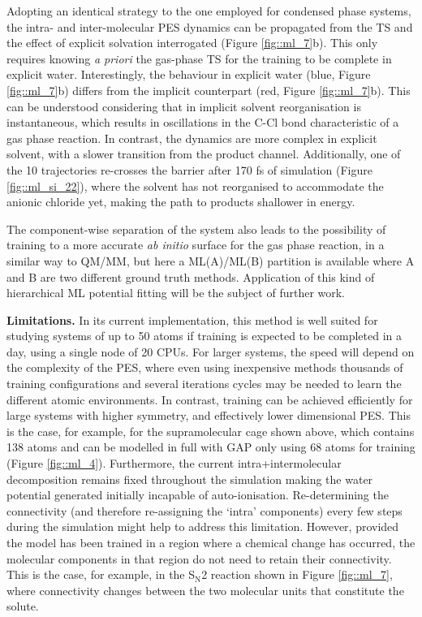 \documentclass[../../main.tex]{subfiles}
\begin{document}
Adopting an identical strategy to the one employed for condensed phase systems, the intra- and inter-molecular PES dynamics can be propagated from the TS and the effect of explicit solvation interrogated (Figure \ref{fig::ml_7}b). This only requires knowing \emph{a priori} the gas-phase TS for the training to be complete in explicit water. Interestingly, the behaviour in explicit water (blue, Figure \ref{fig::ml_7}b) differs from the implicit counterpart (red, Figure \ref{fig::ml_7}b). This can be understood considering that in implicit solvent reorganisation is instantaneous, which results in oscillations in the C-Cl bond characteristic of a gas phase reaction. In contrast, the dynamics are more complex in explicit solvent, with a slower transition from the product channel. Additionally, one of the 10 trajectories re-crosses the barrier after 170 fs of simulation (Figure \ref{fig::ml_si_22}), where the solvent has not reorganised to accommodate the anionic chloride yet, making the path to products shallower in energy.

The component-wise separation of the system also leads to the possibility of training to a more accurate \emph{ab initio} surface for the gas phase reaction, in a similar way to QM/MM, but here a ML(A)/ML(B) partition is available where A and B are two different ground truth methods. Application of this kind of hierarchical ML potential fitting will be the subject of further work.


{\bfseries{Limitations.}} In its current implementation, this method is well suited for studying systems of up to 50 atoms if training is expected to be completed in a day, using a single node of 20 CPUs. For larger systems, the speed will depend on the complexity of the PES, where even using inexpensive methods thousands of training configurations and several iterations cycles may be needed to learn the different atomic environments. In contrast, training can be achieved efficiently for large systems with higher symmetry, and effectively lower dimensional PES. This is the case, for example, for the supramolecular cage shown above, which contains 138 atoms and can be modelled in full with GAP only using 68 atoms for training (Figure \ref{fig::ml_4}). Furthermore, the current intra+intermolecular decomposition remains fixed throughout the simulation making the water potential generated initially incapable of auto-ionisation. Re-determining the connectivity (and therefore re-assigning the `intra' components) every few steps during the simulation might help to address this limitation. However, provided the model has been trained in a region where a chemical change has occurred, the molecular components in that region do not need to retain their connectivity. This is the case, for example, in the S${}_\text{N}$2 reaction shown in Figure \ref{fig::ml_7}, where connectivity changes between the two molecular units that constitute the solute.
\end{document}
